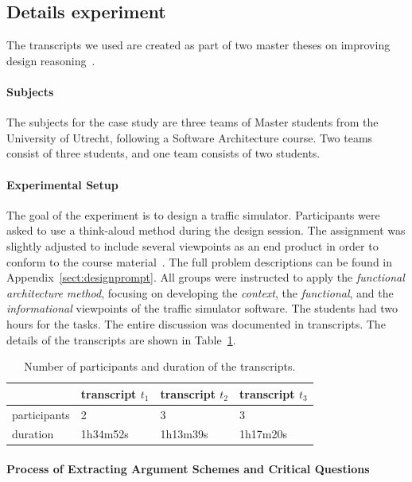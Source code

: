 \subsection{Details experiment}

The transcripts we used are created as part of two master theses on improving design reasoning~\cite{masterthesis1,masterthesis2}.

\paragraph{Subjects} The subjects for the case study are three teams of Master students from the University of Utrecht, following a Software Architecture course. Two teams consist of three students, and one team consists of two students.

\paragraph{Experimental Setup} The goal of the experiment is to design a traffic simulator. Participants were asked to use a think-aloud method during the design session. The assignment was slightly adjusted to include several viewpoints as an end product in order to conform to the course material~\cite{Bass:2012:SAP:2392670}. The full problem descriptions can be found in Appendix~\ref{sect:designprompt}. All groups were instructed to apply the \emph{functional architecture method}, focusing on developing the \emph{context}, the \emph{functional}, and the \emph{informational} viewpoints of the traffic simulator software. The students had two hours for the tasks. The entire discussion was documented in transcripts. The details of the transcripts are shown in Table~\ref{table:transcripts:info}.

\begin{table}[ht]
\centering
\begin{tabular}{|l|l|l|l|}
\hline
& transcript $t_1$ & transcript $t_2$ & transcript $t_3$\\
\hline
participants & 2 & 3 & 3\\
\hline
duration & 1h34m52s & 1h13m39s & 1h17m20s\\
\hline
\end{tabular}
\caption{Number of participants and duration of the transcripts.}
\label{table:transcripts:info}
\end{table}

\paragraph{Process of Extracting Argument Schemes and Critical Questions} %

